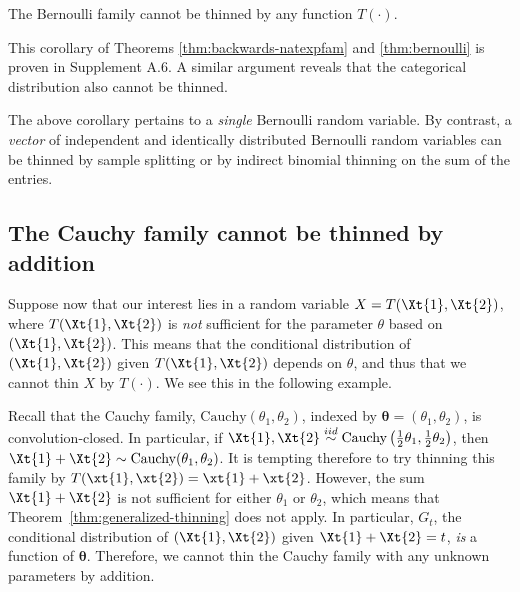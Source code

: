 \documentclass[12pt]{article}
\begin{document}
\begin{corollary}
\label{cor:bern2}
    The Bernoulli family cannot be thinned by any function $T(\cdot)$.
\end{corollary}

This corollary of Theorems \ref{thm:backwards-natexpfam} and \ref{thm:bernoulli} is proven in Supplement A.6.
A similar argument reveals that the categorical distribution also cannot be thinned.

The above corollary pertains to a \emph{single} Bernoulli random variable. By contrast, a \emph{vector} of independent and identically distributed Bernoulli random variables can be thinned by sample splitting or by indirect binomial thinning on the sum of the  entries.

\subsection{The Cauchy family cannot be thinned by addition}
\label{subsec:cauchy}

Suppose now that our interest lies in a random variable $X=T(\Xt{1},\Xt{2})$, where $T(\Xt{1}, \Xt{2})$ is \emph{not} sufficient for the parameter $\theta$ based on $(\Xt{1},\Xt{2})$. This means that the conditional distribution of $(\Xt{1},\Xt{2})$ given $T(\Xt{1},\Xt{2})$ depends on $\theta$, and thus that we cannot thin $X$ by $T(\cdot)$.  We see this in the following example.

\begin{exmp} \label{ex:cauchy}
Recall that the Cauchy family, $\text{Cauchy}(\theta_1, \theta_2)$, indexed by $\boldsymbol\theta=(\theta_1,\theta_2)$,  is convolution-closed. In particular, if $\Xt{1},\Xt{2}\overset{iid}{\sim}\text{Cauchy}\left(\frac{1}{2}\theta_1, \frac{1}{2}\theta_2\right)$, then $\Xt{1} + \Xt{2}\sim\text{Cauchy}(\theta_1, \theta_2)$.  It is tempting therefore to try thinning this family by $T(\xt{1},\xt{2})=\xt{1}+\xt{2}$.  However, the sum $\Xt{1} + \Xt{2}$ is not sufficient for either 
$\theta_1$ or $\theta_2$, which means that Theorem~\ref{thm:generalized-thinning} does not apply. In particular, $G_t$, the conditional distribution of $(\Xt{1},\Xt{2})$ given $\Xt{1} + \Xt{2}=t$, \emph{is} a function of $\boldsymbol\theta$. Therefore, we cannot thin the Cauchy family with any unknown parameters by addition. 
\end{exmp}
\end{document}
